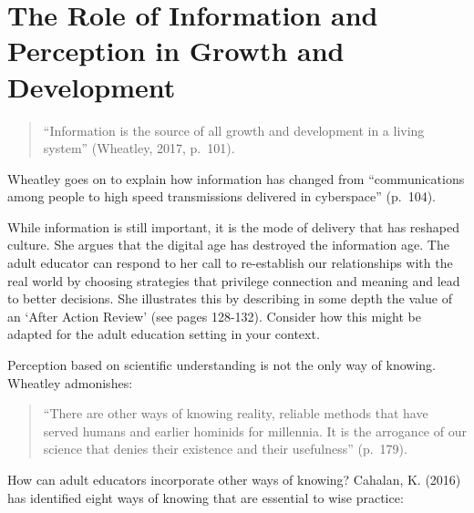 \documentclass[
]{book}
\begin{document}
\hypertarget{the-role-of-information-and-perception-in-growth-and-development}{%
\section{The Role of Information and Perception in Growth and Development}\label{the-role-of-information-and-perception-in-growth-and-development}}

\begin{quote}
``Information is the source of all growth and development in a living system'' (Wheatley, 2017, p.~101).
\end{quote}

Wheatley goes on to explain how information has changed from ``communications among people to high speed transmissions delivered in cyberspace'' (p.~104).

While information is still important, it is the mode of delivery that has reshaped culture. She argues that the digital age has destroyed the information age. The adult educator can respond to her call to re-establish our relationships with the real world by choosing strategies that privilege connection and meaning and lead to better decisions. She illustrates this by describing in some depth the value of an `After Action Review' (see pages 128-132). Consider how this might be adapted for the adult education setting in your context.

Perception based on scientific understanding is not the only way of knowing. Wheatley admonishes:

\begin{quote}
``There are other ways of knowing reality, reliable methods that have served humans and earlier hominids for millennia. It is the arrogance of our science that denies their existence and their usefulness'' (p.~179).
\end{quote}

How can adult educators incorporate other ways of knowing? Cahalan, K. (2016) has identified eight ways of knowing that are essential to wise practice:
\end{document}
